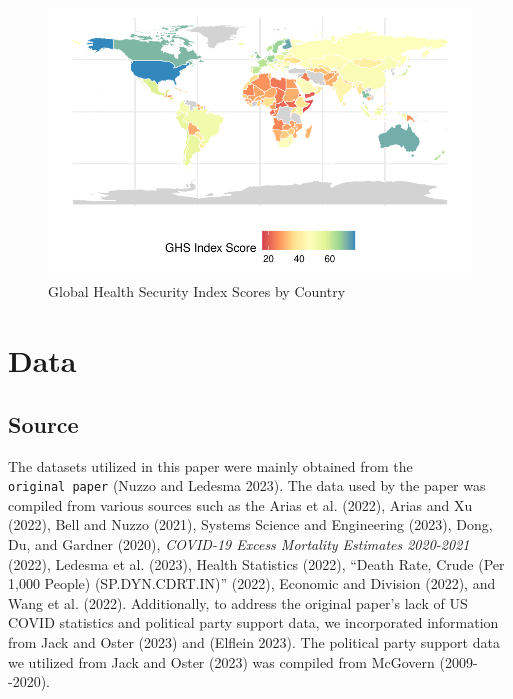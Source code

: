 \documentclass[
  letterpaper,
  DIV=11,
  numbers=noendperiod]{scrartcl}
\begin{document}
\begin{figure}

{\centering \includegraphics{paper_files/figure-pdf/fig-GHS-1.pdf}

}

\caption{\label{fig-GHS}Global Health Security Index Scores by Country}

\end{figure}

\hypertarget{sec-data}{%
\section{Data}\label{sec-data}}

\hypertarget{source}{%
\subsection{Source}\label{source}}

The datasets utilized in this paper were mainly obtained from the
\texttt{original\ paper} (Nuzzo and Ledesma 2023). The data used by the
paper was compiled from various sources such as the Arias et al. (2022),
Arias and Xu (2022), Bell and Nuzzo (2021), Systems Science and
Engineering (2023), Dong, Du, and Gardner (2020), \emph{COVID-19 Excess
Mortality Estimates 2020-2021} (2022), Ledesma et al. (2023), Health
Statistics (2022), {``Death Rate, Crude (Per 1,000 People)
(SP.DYN.CDRT.IN)''} (2022), Economic and Division (2022), and Wang et
al. (2022). Additionally, to address the original paper's lack of US
COVID statistics and political party support data, we incorporated
information from Jack and Oster (2023) and (Elflein 2023). The political
party support data we utilized from Jack and Oster (2023) was compiled
from McGovern (2009-\/-2020).
\end{document}
